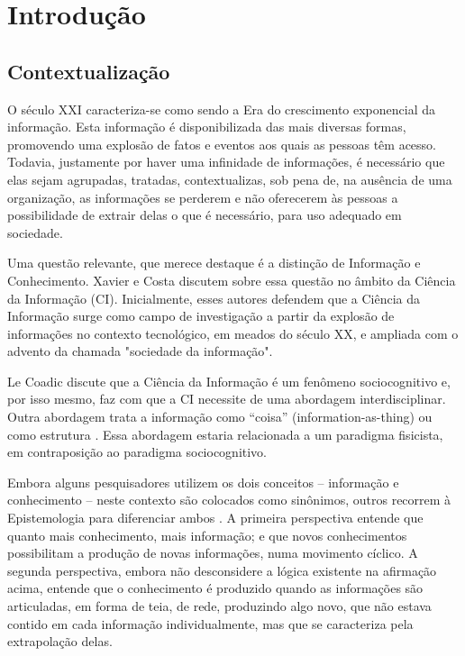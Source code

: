 \chapter{Introdução}\label{intro}

\section{Contextualização}\label{intro:problem}

O século XXI caracteriza-se como sendo a Era do crescimento exponencial da informação. Esta informação é disponibilizada das mais diversas formas, promovendo uma explosão de fatos e eventos aos quais as pessoas têm acesso. Todavia, justamente por haver uma infinidade de informações, é necessário que elas sejam agrupadas, tratadas, contextualizas, sob pena de, na ausência de uma organização, as informações se perderem e não oferecerem às pessoas a possibilidade de extrair delas o que é necessário, para uso adequado em sociedade.

Uma questão relevante, que merece destaque é a distinção de Informação e Conhecimento. Xavier e Costa \cite{xavier2011relaccoes} discutem sobre essa questão no âmbito da Ciência da Informação (CI). Inicialmente, esses autores defendem que a Ciência da Informação surge como campo de investigação a partir da explosão de informações no contexto tecnológico, em meados do século XX, e ampliada com o advento da chamada "sociedade da informação".

Le Coadic \cite{da1996coadic} discute que a Ciência da Informação é um fenômeno sociocognitivo e, por isso mesmo, faz com que a CI necessite de uma abordagem interdisciplinar. Outra abordagem trata a informação como ``coisa'' (information-as-thing) ou como estrutura \cite{xavier2011relaccoes}. Essa abordagem estaria relacionada a um paradigma fisicista, em contraposição ao paradigma sociocognitivo. 

Embora alguns pesquisadores utilizem os dois conceitos -- informação e conhecimento -- neste contexto são colocados como sinônimos, outros recorrem à Epistemologia para diferenciar ambos \cite{xavier2011relaccoes}. A primeira perspectiva entende que quanto mais conhecimento, mais informação; e que novos conhecimentos possibilitam a produção de novas informações, numa movimento cíclico. A segunda perspectiva, embora não desconsidere a lógica existente na afirmação acima, entende que o conhecimento é produzido quando as informações são articuladas, em forma de teia, de rede, produzindo algo novo, que não estava contido em cada informação individualmente, mas que se caracteriza pela extrapolação delas.

